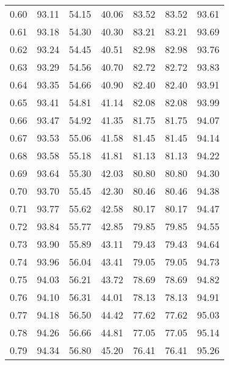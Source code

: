 \begin{tabular}{|c|c|c|c|c|c|c|}
      0.60 &     93.11 &     54.15 &      40.06 &   83.52 &      83.52 &         93.61 \\
      0.61 &     93.18 &     54.30 &      40.30 &   83.21 &      83.21 &         93.69 \\
      0.62 &     93.24 &     54.45 &      40.51 &   82.98 &      82.98 &         93.76 \\
      0.63 &     93.29 &     54.56 &      40.70 &   82.72 &      82.72 &         93.83 \\
      0.64 &     93.35 &     54.66 &      40.90 &   82.40 &      82.40 &         93.91 \\
      0.65 &     93.41 &     54.81 &      41.14 &   82.08 &      82.08 &         93.99 \\
      0.66 &     93.47 &     54.92 &      41.35 &   81.75 &      81.75 &         94.07 \\
      0.67 &     93.53 &     55.06 &      41.58 &   81.45 &      81.45 &         94.14 \\
      0.68 &     93.58 &     55.18 &      41.81 &   81.13 &      81.13 &         94.22 \\
      0.69 &     93.64 &     55.30 &      42.03 &   80.80 &      80.80 &         94.30 \\
      0.70 &     93.70 &     55.45 &      42.30 &   80.46 &      80.46 &         94.38 \\
      0.71 &     93.77 &     55.62 &      42.58 &   80.17 &      80.17 &         94.47 \\
      0.72 &     93.84 &     55.77 &      42.85 &   79.85 &      79.85 &         94.55 \\
      0.73 &     93.90 &     55.89 &      43.11 &   79.43 &      79.43 &         94.64 \\
      0.74 &     93.96 &     56.04 &      43.41 &   79.05 &      79.05 &         94.73 \\
      0.75 &     94.03 &     56.21 &      43.72 &   78.69 &      78.69 &         94.82 \\
      0.76 &     94.10 &     56.31 &      44.01 &   78.13 &      78.13 &         94.91 \\
      0.77 &     94.18 &     56.50 &      44.42 &   77.62 &      77.62 &         95.03 \\
      0.78 &     94.26 &     56.66 &      44.81 &   77.05 &      77.05 &         95.14 \\
      0.79 &     94.34 &     56.80 &      45.20 &   76.41 &      76.41 &         95.26 \\

\end{tabular}
